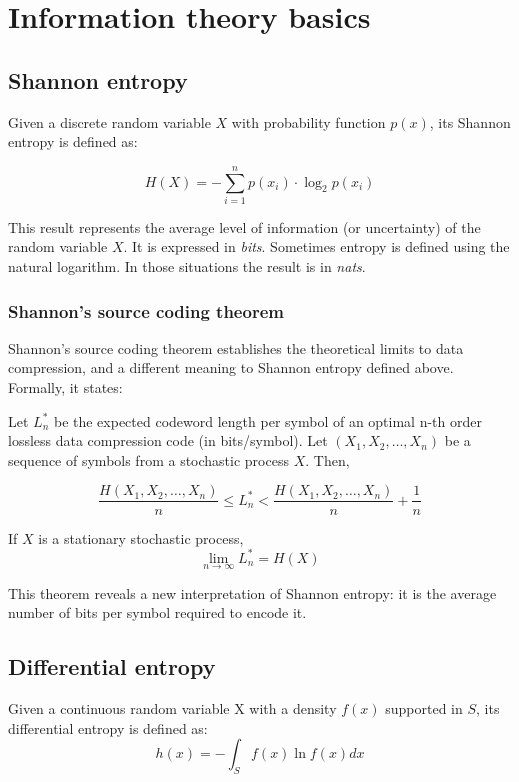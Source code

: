 \section{Information theory basics}
\subsection{Shannon entropy}
Given a discrete random variable $X$ with probability function $p(x)$, its Shannon entropy is defined as:

\begin{equation}
H(X) = - \sum_{i=1}^{n} p(x_i) \cdot \log_2 p(x_i) 
\end{equation}

This result represents the average level of information (or uncertainty) of the random variable $X$. It is expressed in \textit{bits}. Sometimes entropy is defined using the natural logarithm. In those situations the result is in \textit{nats}.


\subsubsection{Shannon's source coding theorem}
Shannon's source coding theorem establishes the theoretical limits to data compression, and a different meaning to Shannon entropy defined above. Formally, it states:

\begin{theorem}
Let $L_n^*$ be the expected codeword length per symbol of an optimal n-th order lossless data compression code (in bits/symbol). Let $(X_1, X_2, \dots, X_n )$ be a sequence of symbols from a stochastic process $X$. Then,

\begin{equation}
	\frac{H(X_1, X_2, \dots, X_n )}{n} \leq L_n^* < \frac{H(X_1, X_2, \dots, X_n )}{n} + \frac{1}{n}
\end{equation}

If $X$ is a stationary stochastic process,
\begin{equation}
	\lim_{n \to \infty} L_n^* = H(X)
\end{equation}
\end{theorem}

This theorem reveals a new interpretation of Shannon entropy: it is the average number of bits per symbol required to encode it.

\subsection{Differential entropy}
Given a continuous random variable X with a density $f(x)$ supported in $S$, its differential entropy is defined as:
\begin{equation} \label{eq:differential_entropy}
h(x) = - \int_{S}^{} f(x) \ln f(x) dx
\end{equation}

